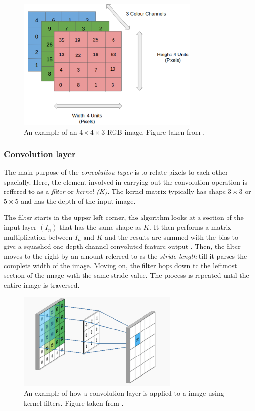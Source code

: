 \documentclass[../main.tex]{subfiles}
\begin{document}
\begin{figure}[!htb]
    \centering
    \includegraphics[width=0.8\textwidth]{fig/rgb.png}
    \caption{An example of an \ensuremath{4\times4\times3} RGB image. Figure taken from \cite{sumit2018}.}
    \label{fig:rgb-input}
\end{figure} 

\subsubsection{Convolution layer}
The main purpose of the \textit{convolution layer} is to relate pixels to each other spacially. Here, the element involved in carrying out the convolution operation is reffered to as a \textit{filter} or \textit{kernel (K)}. The kernel matrix typically has shape \ensuremath{3\times3} or \ensuremath{5\times5} and has the depth of the input image.

The filter starts in the upper left corner, the algorithm looks at a section of the input layer \ensuremath{(I_n)} that has the same shape as $K$. It then performs a matrix multiplication between $I_n$ and $K$ and the results are summed with the bias to give a squashed one-depth channel convoluted feature output \cite{sumit2018}. Then, the filter moves to the right by an amount referred to as the \textit{stride length} till it parses the complete width of the image. Moving on, the filter hops down to the leftmost section of the image with the same stride value. The process is repeated until the entire image is traversed. 

\begin{figure}
    \centering
    \includegraphics[width=0.7\textwidth]{fig/convolution.png}
    \caption{An example of how a convolution layer is applied to a image using kernel filters. Figure taken from \cite{stewart2019}.}
    \label{fig:convolution}
\end{figure}
\end{document}
